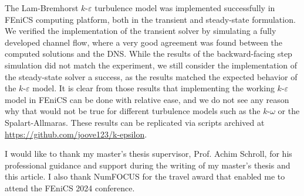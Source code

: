 The Lam-Bremhorst \(k\)-\(\varepsilon\) turbulence model was implemented successfully in FEniCS computing platform, both in the transient and steady-state formulation. We verified the implementation of the transient solver by simulating a fully developed channel flow, where a very good agreement was found between the computed solutions and the DNS. While the results of the backward-facing step simulation did not match the experiment, we still consider the implementation of the steady-state solver a success, as the results matched the expected behavior of the \(k\)-\(\varepsilon\) model. It is clear from those results that implementing the working \(k\)-\(\varepsilon\) model in FEniCS can be done with relative ease, and we do not see any reason why that would not be true for different turbulence models such as the \(k\)-\(\omega\) or the Spalart-Allmaras. These results can be replicated via scripts archived at \href{https://github.com/joove123/k-epsilon}{https://github.com/joove123/k-epsilon}.

\begin{acknowledgement}
    I would like to thank my master's thesis supervisor, Prof. Achim Schroll, for his professional guidance and support during the writing of my master's thesis and this article. I also thank NumFOCUS for the travel award that enabled me to attend the FEniCS 2024 conference. 
\end{acknowledgement}





